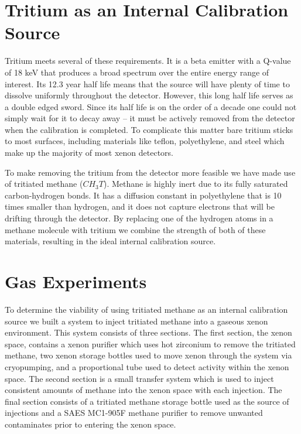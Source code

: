 \documentclass[a4paper,12pt]{article}
\begin{document}
\section{Tritium as an Internal Calibration Source}

Tritium meets several of these requirements.  It is a beta emitter with a Q-value of 18 keV that produces a broad spectrum over the entire energy range of interest.  Its 12.3 year half life means that the source will have plenty of time to dissolve uniformly throughout the detector.  However, this long half life serves as a double edged sword.  Since its half life is on the order of a decade one could not simply wait for it to decay away -- it must be actively removed from the detector when the calibration is completed.  To complicate this matter bare tritium sticks to most surfaces, including materials like teflon, polyethylene, and steel which make up the majority of most xenon detectors.

To make removing the tritium from the detector more feasible we have made use of tritiated methane ($ CH_3T $).  Methane is highly inert due to its fully saturated carbon-hydrogen bonds.  It has a diffusion constant in polyethylene that is 10 times smaller than hydrogen, and it does not capture electrons that will be drifting through the detector.  By replacing one of the hydrogen atoms in a methane molecule with tritium we combine the strength of both of these materials, resulting in the ideal internal calibration source.


\section{Gas Experiments}

To determine the viability of using tritiated methane as an internal calibration source we built a system to inject tritiated methane into a gaseous xenon environment.  This system consists of three sections.  The first section, the xenon space, contains a xenon purifier which uses hot zirconium to remove the tritiated methane, two xenon storage bottles used to move xenon through the system via cryopumping, and a proportional tube used to detect activity within the xenon space.  The second section is a small transfer system which is used to inject consistent amounts of methane into the xenon space with each injection.  The final section consists of a tritiated methane storage bottle used as the source of injections and a SAES MC1-905F methane purifier to remove unwanted contaminates prior to entering the xenon space.
\end{document}
